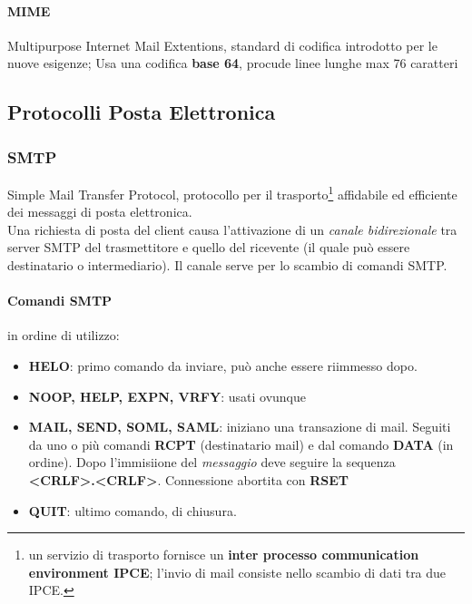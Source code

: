 \documentclass[a4paper,11pt]{article}
\begin{document}
\paragraph{MIME}
Multipurpose Internet Mail Extentions, standard di codifica introdotto per le nuove esigenze;  Usa una codifica \textbf{base 64}, procude linee lunghe max 76 caratteri
\subsection{Protocolli Posta Elettronica}
\subsubsection{SMTP}
Simple Mail Transfer Protocol, protocollo per il trasporto\footnote{un servizio di trasporto fornisce un \textbf{inter processo communication environment IPCE}; l'invio di mail consiste nello scambio di dati tra due IPCE.} affidabile ed efficiente dei messaggi di posta elettronica. \\
Una richiesta di posta del client causa l'attivazione di un \textit{canale bidirezionale} tra server SMTP del trasmettitore e quello del ricevente (il quale può essere destinatario o intermediario). Il canale serve per lo scambio di comandi SMTP.
\paragraph{Comandi SMTP} in ordine di utilizzo:
\begin{itemize}
\item[1]\textbf{HELO}: primo comando da inviare, può anche essere riimmesso dopo.
\item[2]\textbf{NOOP, HELP, EXPN, VRFY}: usati ovunque
\item[3]\textbf{MAIL, SEND, SOML, SAML}: iniziano una transazione di mail. Seguiti da uno o più comandi \textbf{RCPT} (destinatario mail) e dal comando \textbf{DATA} (in ordine). Dopo l'immisiione del \textit{messaggio} deve seguire la sequenza \textbf{<CRLF>.<CRLF>}. Connessione abortita con \textbf{RSET}
\item[4] \textbf{QUIT}: ultimo comando, di chiusura.
\end{itemize}
\end{document}
